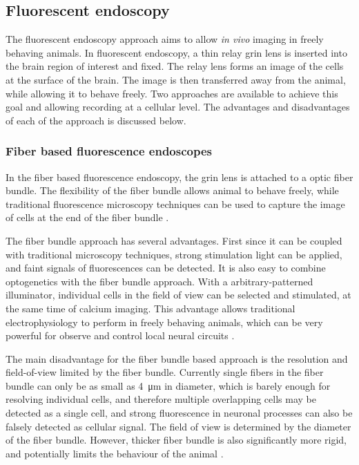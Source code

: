 \subsection{Fluorescent endoscopy}

The fluorescent endoscopy approach aims to allow \textit{in vivo} imaging in freely behaving animals. In fluorescent endoscopy, a thin relay \gls{grin} lens is inserted into the brain region of interest and fixed. The relay lens forms an image of the cells at the surface of the brain. The image is then transferred away from the animal, while allowing it to behave freely. Two approaches are available to achieve this goal and allowing recording at a cellular level. The advantages and disadvantages of each of the approach is discussed below. 

\subsubsection{Fiber based fluorescence endoscopes}
In the fiber based fluorescence endoscopy, the \gls{grin} lens is attached to a optic fiber bundle. The flexibility of the fiber bundle allows animal to behave freely, while traditional fluorescence microscopy techniques can be used to capture the image of cells at the end of the fiber bundle \citep{flusberg08}. 

The fiber bundle approach has several advantages. First since it can be coupled with traditional microscopy techniques, strong stimulation light can be applied, and faint signals of fluorescences can be detected. It is also easy to combine optogenetics with the fiber bundle approach. With a arbitrary-patterned illuminator, individual cells in the field of view can be selected and stimulated, at the same time of calcium imaging. This advantage allows traditional electrophysiology to perform in freely behaving animals, which can be very powerful for observe and control local neural circuits \citep{szabo14}.

The main disadvantage for the fiber bundle based approach is the resolution and field-of-view limited by the fiber bundle. Currently single fibers in the fiber bundle can only be as small as \SI{4}{\um} in diameter, which is barely enough for resolving individual cells, and therefore multiple overlapping cells may be detected as a single cell, and strong fluorescence in neuronal processes can also be falsely detected as cellular signal. The field of view is determined by the diameter of the fiber bundle. However, thicker fiber bundle is also significantly more rigid, and potentially limits the behaviour of the animal \citep{yang17}. 


